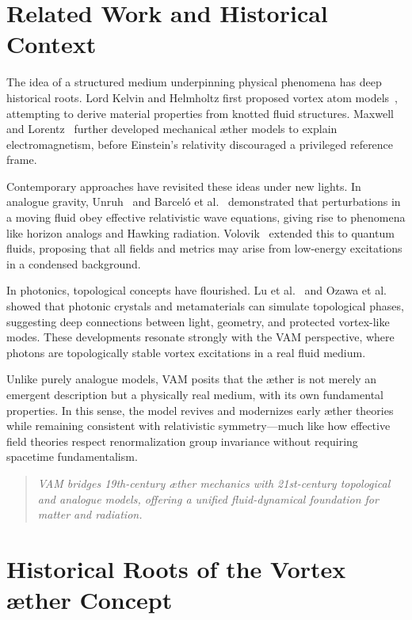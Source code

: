\section{Related Work and Historical Context}

    The idea of a structured medium underpinning physical phenomena has deep historical roots. Lord Kelvin and Helmholtz first proposed vortex atom models~\cite{thomson1867}, attempting to derive material properties from knotted fluid structures. Maxwell~\cite{maxwell1861} and Lorentz~\cite{lorentz1904} further developed mechanical æther models to explain electromagnetism, before Einstein's relativity discouraged a privileged reference frame.

    Contemporary approaches have revisited these ideas under new lights. In analogue gravity, Unruh~\cite{unruh1981} and Barceló et al.~\cite{barcelo2011} demonstrated that perturbations in a moving fluid obey effective relativistic wave equations, giving rise to phenomena like horizon analogs and Hawking radiation. Volovik~\cite{volovik2003} extended this to quantum fluids, proposing that all fields and metrics may arise from low-energy excitations in a condensed background.

    In photonics, topological concepts have flourished. Lu et al.~\cite{lu2014} and Ozawa et al.~\cite{ozawa2019} showed that photonic crystals and metamaterials can simulate topological phases, suggesting deep connections between light, geometry, and protected vortex-like modes. These developments resonate strongly with the VAM perspective, where photons are topologically stable vortex excitations in a real fluid medium.

    Unlike purely analogue models, VAM posits that the æther is not merely an emergent description but a physically real medium, with its own fundamental properties. In this sense, the model revives and modernizes early æther theories while remaining consistent with relativistic symmetry—much like how effective field theories respect renormalization group invariance without requiring spacetime fundamentalism.

    \begin{quote}
        \emph{VAM bridges 19th-century æther mechanics with 21st-century topological and analogue models, offering a unified fluid-dynamical foundation for matter and radiation.}
    \end{quote}


\section{Historical Roots of the Vortex \ae ther Concept}


